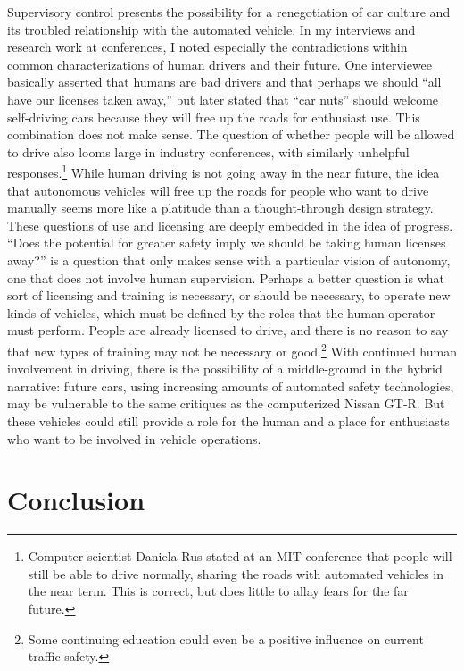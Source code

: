 Supervisory control presents the possibility for a
renegotiation of car 
culture and its troubled relationship with the automated vehicle. In
my interviews and research work at conferences, I noted especially the
contradictions within common characterizations of human
drivers and their future. One interviewee basically asserted that
humans are bad drivers and that perhaps we should ``all have our
licenses taken away,'' but later stated that ``car nuts'' should
welcome self-driving cars because they will free up the roads for
enthusiast use. This combination does not make sense. The
question of whether people will be allowed to drive also looms large
in industry conferences, with similarly unhelpful
responses.\footnote{Computer scientist Daniela Rus stated at an MIT 
conference that people will still be able to
drive normally, sharing the roads with automated vehicles in the near
term. This is correct, but does little to allay fears for the far future.} While
human driving is not going away in the near future, the idea that
autonomous vehicles will free up the roads for people who want to
drive manually seems more like a platitude than a thought-through
design strategy. These questions of use and licensing are deeply embedded in the idea
of progress. ``Does the potential for greater safety imply we should be
taking human licenses away?'' is a question that only makes
sense with a particular vision of autonomy, one that does not involve
human supervision. Perhaps a better question is what sort of licensing
and training is necessary, or should be necessary, to operate new
kinds of vehicles, which must be defined by the roles that the human
operator must perform. People are already licensed to drive, and there is no reason to
say that new types of training may not be necessary or good.\footnote{
Some continuing education could even be a positive
influence on current traffic safety.} With continued human
involvement in driving, there is 
the possibility of a
middle-ground in the hybrid narrative:  future cars, using increasing
amounts of automated safety technologies,
may be vulnerable to the same critiques as the computerized Nissan GT-R. But these
vehicles could still provide a role for the human and a place for
enthusiasts who want to be involved in vehicle operations.

\section{Conclusion}

